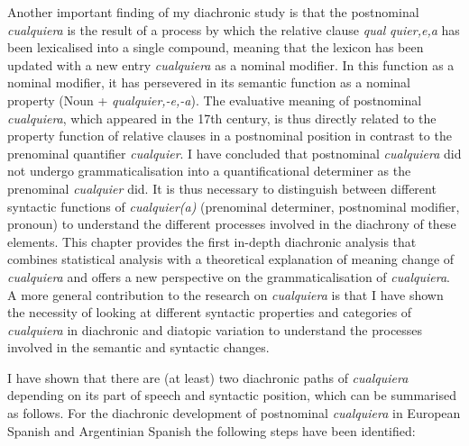   \largerpage
  Another important finding of my diachronic study is that the postnominal \textit{cualquiera} is the result of a process by which the relative clause \textit{qual} \textit{quier,e,a} has been lexicalised into a single compound, {meaning that the lexicon has been updated with a new entry \textit{cualquiera} as a nominal modifier. In this function as a nominal modifier, it has persevered in its semantic function as a nominal property (Noun + \textit{qualquier,-e,-a}). The evaluative meaning of postnominal \textit{cualquiera}, which appeared in the 17{th} century, is thus directly related to the property function of relative clauses in a postnominal position in contrast to the prenominal quantifier \textit{cualquier}. I have concluded that postnominal \textit{cualquiera} did not undergo grammaticalisation into a quantificational determiner as the prenominal \textit{cualquier} did. It is thus necessary to distinguish between different syntactic functions of \textit{cualquier(a)} (prenominal determiner, postnominal modifier, pronoun) to understand the different processes involved in the diachrony of these elements. This chapter provides the first in-depth diachronic analysis that combines statistical analysis with a theoretical explanation of meaning change of \textit{cualquiera} and offers a new perspective on the grammaticalisation of \textit{cualquiera}. A more general contribution to the research on \textit{cualquiera} is that I have shown the necessity of looking at different syntactic properties and categories of \textit{cualquiera} in diachronic and diatopic variation to understand the processes involved in the semantic and syntactic changes.}

  \largerpage
  I have shown that there are (at least) two diachronic paths of \textit{cualquiera} depending on its part of speech and syntactic position,  which can be summarised as follows. For the diachronic development of postnominal \textit{cualquiera} in European Spanish and Argentinian Spanish the following steps have been identified:

